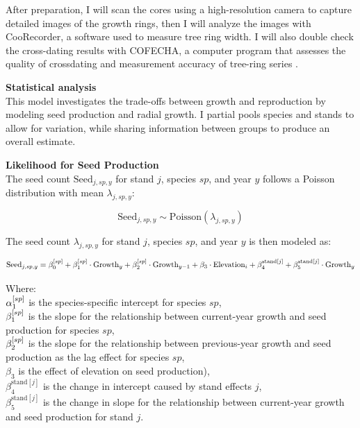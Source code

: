\documentclass[11pt,letter]{article}
\begin{document}
After preparation, I will scan the cores using a high-resolution camera to capture detailed images of the growth rings, then I will analyze the images with CooRecorder, a software used to measure tree ring width. I will also double check the cross-dating results with COFECHA, a computer program that assesses the quality of crossdating and measurement accuracy of tree-ring series \citep{cook2013methods, speer2010fundamentals}.\par

\textbf{Statistical analysis}\\
This model investigates the trade-offs between growth and reproduction by modeling seed production and radial growth. I partial pools species and stands to allow for variation, while sharing information between groups to produce an overall estimate.\par

\textbf{Likelihood for Seed Production}\\

The seed count \(\text{Seed}_{j,sp,y}\) for stand \(j\), species \(sp\), and year \(y\) follows a Poisson distribution with mean \(\lambda_{j,sp,y}\):

\[
\text{Seed}_{j,sp,y} \sim \text{Poisson}(\lambda_{j,sp,y})
\]

The seed count \(\lambda_{j,sp,y}\) for stand \(j\), species \(sp\), and year \(y\) is then modeled as:

\[
\text{Seed}_{j,sp,y} = \beta_0^{\text[sp]} + \beta_1^{\text[sp]} \cdot \text{Growth}_y + \beta_2^{\text[sp]} \cdot \text{Growth}_{y-1} + \beta_3 \cdot \text{Elevation}_i + \beta_4^{\text{stand}[j]} + \beta_5^{\text{stand}[j]} \cdot \text{Growth}_y
\]

Where:\\
\(\alpha_1^{\text[sp]}\) is the species-specific intercept for species \(sp\),\\
\(\beta_1^{\text[sp]}\) is the slope for the relationship between current-year growth and seed production for species \(sp\),\\
\(\beta_2^{\text[sp]}\) is the slope for the relationship between previous-year growth and seed production as the lag effect for species \(sp\),\\
\(\beta_3\) is the effect of elevation on seed production),\\
\(\beta_4^{\text{stand}[j]}\) is the change in intercept caused by stand effects \(j\),\\
\(\beta_5^{\text{stand}[j]}\) is the change in slope for the relationship between current-year growth and seed production for stand \(j\).
\end{document}
